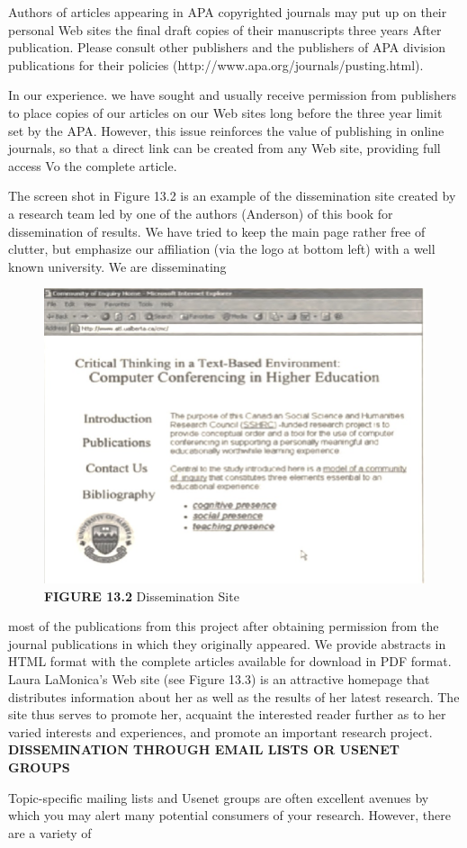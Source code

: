 \documentclass{book}
\begin{document}
Authors of articles appearing in APA copyrighted journals may put up on their personal Web sites the final draft copies of their manuscripts three years After publication. Please consult other publishers and the publishers of APA division publications for their policies (http://www.apa.org/journals/pusting.html).\par 
In our experience. we have sought and usually receive permission from publishers to place copies of our articles on our Web sites long before the three year limit set by the APA. However, this issue reinforces the value of publishing in online journals, so that a direct link can be created from any Web site, providing full access Vo the complete article.\par 
The screen shot in Figure 13.2 is an example of the dissemination site created by a research team led by one of the authors (Anderson) of this book for dissemination of results. We have tried to keep the main page rather free of clutter, but emphasize our affiliation (via the logo at bottom left) with a well known university. We are disseminating\newpage
\begin{figure}
\includegraphics[width=\textwidth]{pic.jpg}
\caption{\textbf{FIGURE 13.2}  Dissemination Site}
\end{figure}
most of the publications from this project after obtaining permission from the journal publications in which they originally appeared. We provide abstracts in HTML format with the complete articles available for download in PDF format. Laura LaMonica's Web site (see Figure 13.3) is an attractive homepage that distributes information about her as well as the results of her latest research. The site thus serves to promote her, acquaint the interested reader further as to her varied interests and experiences, and promote an important research project.\\
\textbf{DISSEMINATION THROUGH EMAIL LISTS OR USENET GROUPS}\par  Topic-specific mailing lists and Usenet groups are often excellent avenues by which you may alert many potential consumers of your research. However, there are a variety of
\end{document}
